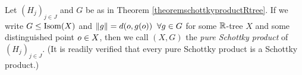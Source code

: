 
\begin{definition}
\label{definitionschottkyproductRtree}
Let $(H_j)_{j\in J}$ and $G$ be as in Theorem \ref{theoremschottkyproductRtree}. If we write $G\leq\operatorname{Isom}(X)$ and $\|g\| = d(o,g(o))\;\;\forall g\in G$ for some $\R$-tree $X$ and some distinguished point $o\in X$, then we call $(X,G)$ the \emph{pure Schottky product} of $(H_j)_{j\in J}$. (It is readily verified that every pure Schottky product is a Schottky product.)
\end{definition}

